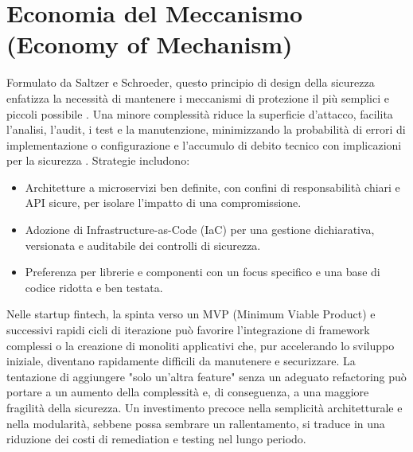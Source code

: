 \section{Economia del Meccanismo (Economy of Mechanism)}
Formulato da Saltzer e Schroeder, questo principio di design della sicurezza enfatizza la necessità di mantenere i meccanismi di protezione il più semplici e piccoli possibile \cite{Saltzer_Schroeder_1975}. Una minore complessità riduce la superficie d'attacco, facilita l'analisi, l'audit, i test e la manutenzione, minimizzando la probabilità di errori di implementazione o configurazione e l'accumulo di debito tecnico con implicazioni per la sicurezza \cite{Smith_2012_SaltzerReview}.
Strategie includono:
\begin{itemize}
\item Architetture a microservizi ben definite, con confini di responsabilità chiari e API sicure, per isolare l'impatto di una compromissione.
\item Adozione di Infrastructure-as-Code (IaC) per una gestione dichiarativa, versionata e auditabile dei controlli di sicurezza.
\item Preferenza per librerie e componenti con un focus specifico e una base di codice ridotta e ben testata.
\end{itemize}
Nelle startup fintech, la spinta verso un MVP (Minimum Viable Product) e successivi rapidi cicli di iterazione può favorire l'integrazione di framework complessi o la creazione di monoliti applicativi che, pur accelerando lo sviluppo iniziale, diventano rapidamente difficili da manutenere e securizzare. La tentazione di aggiungere "solo un'altra feature" senza un adeguato refactoring può portare a un aumento della complessità e, di conseguenza, a una maggiore fragilità della sicurezza. Un investimento precoce nella semplicità architetturale e nella modularità, sebbene possa sembrare un rallentamento, si traduce in una riduzione dei costi di remediation e testing nel lungo periodo.
